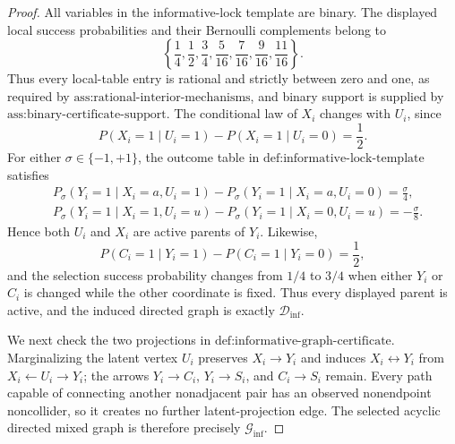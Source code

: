 \documentclass{article}
\begin{document}
\begin{proof}
All variables in the informative-lock template are binary.  The displayed local success probabilities and their Bernoulli complements belong to
\[
 \left\{\frac14,\frac12,\frac34,
              \frac5{16},\frac7{16},\frac9{16},\frac{11}{16}\right\}.
\]
Thus every local-table entry is rational and strictly between zero and one, as required by \(\text{ass:rational-interior-mechanisms}\), and binary support is supplied by \(\text{ass:binary-certificate-support}\).  The conditional law of \(X_i\) changes with \(U_i\), since
\[
 P(X_i=1\mid U_i=1)-P(X_i=1\mid U_i=0)=\frac12.
\]
For either \(\sigma\in\{-1,+1\}\), the outcome table in \(\text{def:informative-lock-template}\) satisfies
\[
 \begin{aligned}
 &P_\sigma(Y_i=1\mid X_i=a,U_i=1)
   -P_\sigma(Y_i=1\mid X_i=a,U_i=0)=\frac{\sigma}{4},\\
 &P_\sigma(Y_i=1\mid X_i=1,U_i=u)
   -P_\sigma(Y_i=1\mid X_i=0,U_i=u)=-\frac{\sigma}{8}.
 \end{aligned}
\]
Hence both \(U_i\) and \(X_i\) are active parents of \(Y_i\).  Likewise,
\[
 P(C_i=1\mid Y_i=1)-P(C_i=1\mid Y_i=0)=\frac12,
\]
and the selection success probability changes from \(1/4\) to \(3/4\) when either \(Y_i\) or \(C_i\) is changed while the other coordinate is fixed.  Thus every displayed parent is active, and the induced directed graph is exactly \(\mathcal D_{\mathrm{inf}}\).

We next check the two projections in \(\text{def:informative-graph-certificate}\).  Marginalizing the latent vertex \(U_i\) preserves \(X_i\to Y_i\) and induces \(X_i\leftrightarrow Y_i\) from \(X_i\leftarrow U_i\to Y_i\); the arrows \(Y_i\to C_i\), \(Y_i\to S_i\), and \(C_i\to S_i\) remain.  Every path capable of connecting another nonadjacent pair has an observed nonendpoint noncollider, so it creates no further latent-projection edge.  The selected acyclic directed mixed graph is therefore precisely \(\mathcal G_{\mathrm{inf}}\).


\end{proof}
\end{document}
